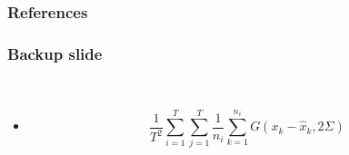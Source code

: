 \backupbegin

\begin{frame}[allowframebreaks]
  \frametitle{References}
  
  
\end{frame}

\begin{frame}
  \frametitle{Backup slide}
  \begin{description}[]
  \item[Crispness score formula] \hfill \\
  \begin{itemize}
  \item $$\frac{1}{T^2}\sum_{i=1}^T\sum_{j=1}^T\frac{1}{n_i}\sum_{k=1}^{n_i}G(x_k-\hat{x}_k,2\Sigma)$$
  \end{itemize}
  \end{description}
\end{frame}

